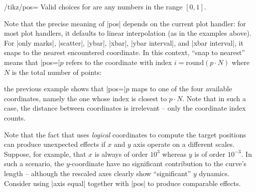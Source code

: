 {\begin{key}{/tikz/pos=}
    Valid choices for  are any numbers in the range $[0,1]$.

    Note that the precise meaning of |pos| depends on the current plot handler:
    for most plot handlers, it defaults to linear interpolation (as in the
    examples above). For |only marks|, |scatter|, |ybar|, |xbar|,
    |ybar interval|, and |xbar interval|, it snaps to the nearest encountered
    coordinate. In this context, ``snap to nearest'' means that |pos=|$p$
    refers to the coordinate with index $i = \text{round}(p \cdot N)$ where $N$
    is the total number of points:
\begin{codeexample}[]
\end{codeexample}
    \noindent the previous example shows that |pos=|$p$ maps to one of the four
    available coordinates, namely the one whose index is closest to $p\cdot N$.
    Note that in such a case, the distance between coordinates is irrelevant --
    only the coordinate index counts.

    Note that the fact that \PGFPlots{} uses \emph{logical} coordinates to
    compute the target positions can produce unexpected effects if $x$ and $y$
    axis operate on a different scales. Suppose, for example, that $x$ is
    always of order $10^3$ whereas $y$ is of order $10^{-3}$. In such a
    scenario, the $y$-coordinate have no significant contribution to the
    curve's length -- although the rescaled axes clearly show ``significant''
    $y$ dynamics. Consider using |axis equal| together with |pos| to produce
    comparable effects.
\end{key}

}
